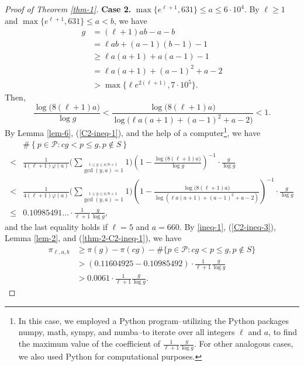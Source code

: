 \documentclass[12pt,a4paper,reqno]{amsart}
\numberwithin{equation}{section}
\def\cP{{\mathcal P}}
\theoremstyle{plain}
\theoremstyle{definition}
\begin{document}
\begin{proof}[Proof of Theorem \ref{thm-1}]
	\textbf{Case 2.} $\max\{ e^{\ell+1},631\}\leq a\leq 6\cdot 10^{4}$. By $\ell\geq 1$ and $\max\{ e^{\ell+1},631\}\leq a<b$, we have 
	\begin{align}\label{C2-ineq-3}
		g&=(\ell+1)ab-a-b\nonumber\\
		&=\ell ab+(a-1)(b-1)-1\nonumber\\
		& \geq \ell a(a+1)+a(a-1)-1\nonumber\\
		&= \ell a(a+1)+(a-1)^{2}+a-2 \nonumber\\
		&> \max\{\ell e^{2(\ell+1)},7\cdot 10^{5}\}.
	\end{align} 
	Then,
	\begin{equation}\label{C2-ineq-1}
		\frac{\log \big(8(\ell+1)a\big)}{\log g}
		<\frac{\log\big(8(\ell+1)a\big)}{\log \big( \ell a(a+1)+(a-1)^{2}+a-2 \big)}<1.
	\end{equation}
	By Lemma \ref{lem-6}, (\ref{C2-ineq-1}), and the help of a computer\footnote{In this case, we employed a Python program--utilizing the Python packages numpy, math, sympy, and numba--to iterate over all integers $\ell$ and $a$, to find the maximum value of the coefficient of $\frac{1}{\ell+1}\frac{g}{\log g}$. For other analogous cases, we also used Python for computational purposes.}, 
	we have 
	\begin{align}
		&\#\left\{p\in\cP:cg< p\leq g, p\notin S \right\}\nonumber\\
		<& \frac{1}{4(\ell+1)\varphi(a)} \Bigg(\sum_{\stackrel{1\leq y\leq a/8+1}{\gcd(y,a)=1} }1\Bigg) \left( 1-\frac{\log \big(8(\ell+1)a\big)}{\log g}\right)^{-1}\cdot \frac{g}{\log g}\nonumber\\
		<& \frac{1}{4(\ell+1)\varphi(a)} \Bigg(\sum_{\stackrel{1\leq y\leq a/8+1}{\gcd(y,a)=1} }1\Bigg) \left( 1-\frac{\log\big(8(\ell+1)a\big)}{\log \left( \ell a(a+1)+(a-1)^{2}+a-2 \right)} \right)^{-1}\cdot \frac{g}{\log g}\nonumber\\
		\leq& 	0.10985491\ldots\cdot \frac{1}{\ell+1}\frac{g}{\log g}, \label{thm-2-C2-ineq-1}
	\end{align}
	and the last equality holds if $\ell=5$ and $a=660$.
	By \eqref{ineq-1}, (\ref{C2-ineq-3}), Lemma \ref{lem-2}, and (\ref{thm-2-C2-ineq-1}), 
	we have
	\begin{align*}
		\pi_{\ell,a,b}
		&\geq \pi(g)-\pi(cg)-\#\{p\in\cP: cg< p\leq g, p\notin S\}\\
		&> (0.11604925- 0.10985492)\cdot \frac{1}{\ell+1}\frac{g}{\log g}\\
		&> 0.0061 \cdot \frac{1}{\ell+1}\frac{g}{\log g}.
	\end{align*}
	

\end{proof}
\end{document}
